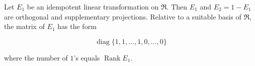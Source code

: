 Let $E_1$ be an idempotent linear transformation on $\mathfrak{R}$. Then $E_1$ and $E_2 = 1 - E_1$ are orthogonal and supplementary projections. Relative to a suitable basis of $\mathfrak{R}$, the matrix of $E_1$ has the form

$$\operatorname{diag}\{1, 1, \ldots, 1, 0, \ldots, 0\}$$

where the number of $1$'s equals $\operatorname{Rank} E_1$.
